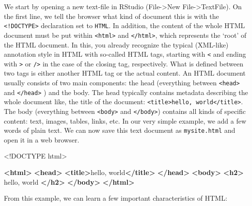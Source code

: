 \documentclass[
  12pt,
]{style/krantz}
\newenvironment{Shaded}{\begin{snugshade}}{\end{snugshade}}
\newcommand{\DataTypeTok}[1]{\textcolor[rgb]{0.13,0.29,0.53}{#1}}
\newcommand{\KeywordTok}[1]{\textcolor[rgb]{0.13,0.29,0.53}{\textbf{#1}}}
\newcommand{\NormalTok}[1]{#1}
\begin{document}
We start by opening a new text-file in RStudio (File-\textgreater New File-\textgreater TextFile). On the first line, we tell the browser what kind of document this is with the \texttt{\textless{}!DOCTYPE\textgreater{}} declaration set to \texttt{HTML}. In addition, the content of the whole HTML document must be put within \texttt{\textless{}html\textgreater{}} and \texttt{\textless{}/html\textgreater{}}, which represents the `root' of the HTML document. In this, you already recognize the typical (XML-like) annotation style in HTML with so-called HTML tags, starting with \texttt{\textless{}} and ending with \texttt{\textgreater{}} or \texttt{/\textgreater{}} in the case of the closing tag, respectively. What is defined between two tags is either another HTML tag or the actual content. An HTML document usually consists of two main components: the head (everything between \texttt{\textless{}head\textgreater{}} and \texttt{\textless{}/head\textgreater{}} ) and the body. The head typically contains metadata describing the whole document like, the title of the document: \texttt{\textless{}title\textgreater{}hello,\ world\textless{}/title\textgreater{}}. The body (everything between \texttt{\textless{}body\textgreater{}} and \texttt{\textless{}/body\textgreater{}}) contains all kinds of specific content: text, images, tables, links, etc. In our very simple example, we add a few words of plain text. We can now save this text document as \texttt{mysite.html} and open it in a web browser.

\begin{Shaded}
\begin{Highlighting}[]
     \DataTypeTok{\textless{}!DOCTYPE }\NormalTok{html}\DataTypeTok{\textgreater{}}

     \KeywordTok{\textless{}html\textgreater{}}
         \KeywordTok{\textless{}head\textgreater{}}
             \KeywordTok{\textless{}title\textgreater{}}\NormalTok{hello, world}\KeywordTok{\textless{}/title\textgreater{}}
         \KeywordTok{\textless{}/head\textgreater{}}
         \KeywordTok{\textless{}body\textgreater{}}
             \KeywordTok{\textless{}h2\textgreater{}}\NormalTok{ hello, world }\KeywordTok{\textless{}/h2\textgreater{}}
         \KeywordTok{\textless{}/body\textgreater{}}
     \KeywordTok{\textless{}/html\textgreater{}}
\end{Highlighting}
\end{Shaded}

From this example, we can learn a few important characteristics of HTML:
\end{document}
